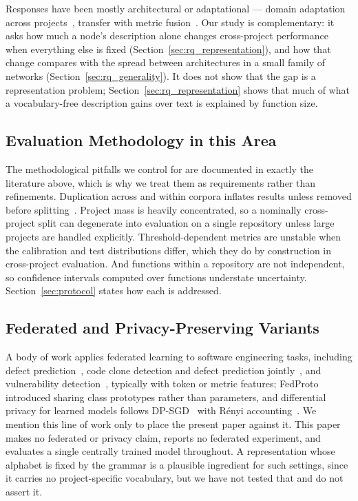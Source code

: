 Responses have been mostly architectural or adaptational --- domain adaptation
across projects~\cite{liu2022cdvuld, zhang2023cpvd, li2023vulgda}, transfer
with metric fusion~\cite{cai2024csvdtf}. Our study is complementary: it
asks how much a node's description alone changes cross-project performance
when everything else is fixed (Section~\ref{sec:rq_representation}), and how that
change compares with the spread between architectures in a small family of
networks (Section~\ref{sec:rq_generality}). It does not show that the gap is a
representation problem; Section~\ref{sec:rq_representation} shows that much of
what a vocabulary-free description gains over text is explained by function
size.

\subsection{Evaluation Methodology in this Area}
The methodological pitfalls we control for are documented in exactly the
literature above, which is why we treat them as requirements rather than
refinements. Duplication across and within corpora inflates results unless
removed before splitting~\cite{ding2025primevul, chen2023diversevul}. Project
mass is heavily concentrated, so a nominally cross-project split can
degenerate into evaluation on a single repository unless large projects are
handled explicitly. Threshold-dependent metrics are unstable when the
calibration and test distributions differ, which they do by construction in
cross-project evaluation. And functions within a repository are not
independent, so confidence intervals computed over functions understate
uncertainty. Section~\ref{sec:protocol} states how each is addressed.

\subsection{Federated and Privacy-Preserving Variants}
A body of work applies federated learning to software engineering tasks,
including defect prediction~\cite{yamamoto2023flr}, code clone detection and
defect prediction jointly~\cite{yang2024federated}, and vulnerability
detection~\cite{zhang2024flvul, hu2024vulfl}, typically with token or metric
features; FedProto~\cite{tan2022fedproto} introduced sharing class prototypes
rather than parameters, and differential privacy for learned models follows
DP-SGD~\cite{abadi2016deep} with R\'enyi accounting~\cite{mironov2019rdp}.
We mention this line of work only to place the present paper against it. This
paper makes no federated or privacy claim, reports no federated experiment, and
evaluates a single centrally trained model throughout. A representation whose
alphabet is fixed by the grammar is a plausible ingredient for such settings,
since it carries no project-specific vocabulary, but we have not tested that
and do not assert it.
